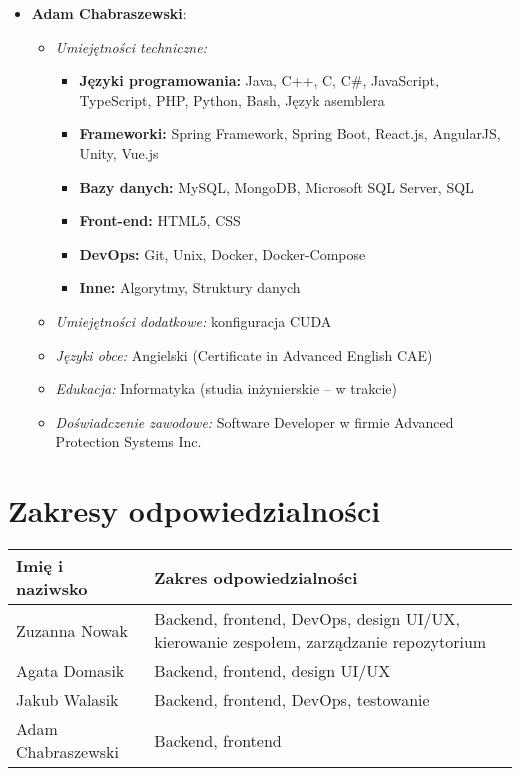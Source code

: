 \documentclass[12pt,a4paper,colorlinks=true,linkcolor=NavyBlue,citecolor=red,urlcolor=NavyBlue]{book}
\begin{document}
\begin{itemize}
    \item \textbf{Adam Chabraszewski}:
    \begin{itemize}
        \item \textit{Umiejętności techniczne:} 
        \begin{itemize}
            \item \textbf{Języki programowania:} Java, C++, C, C\#, JavaScript, TypeScript, PHP, Python, Bash, Język asemblera
            \item \textbf{Frameworki:} Spring Framework, Spring Boot, React.js, AngularJS, Unity, Vue.js
            \item \textbf{Bazy danych:} MySQL, MongoDB, Microsoft SQL Server, SQL
            \item \textbf{Front-end:} HTML5, CSS
            \item \textbf{DevOps:} Git, Unix, Docker, Docker-Compose
            \item \textbf{Inne:} Algorytmy, Struktury danych
        \end{itemize}
        \item \textit{Umiejętności dodatkowe:} konfiguracja CUDA
        \item \textit{Języki obce:} Angielski (Certificate in Advanced English CAE)
        \item \textit{Edukacja:} Informatyka (studia inżynierskie – w trakcie)
        \item \textit{Doświadczenie zawodowe:} Software Developer w firmie Advanced Protection Systems Inc.
    \end{itemize}
\end{itemize}

\section{Zakresy odpowiedzialności}
\begin{center}
\begin{tabular}{|p{4.5cm}|p{8cm}|}
\hline
\textbf{Imię i naziwsko} & \textbf{Zakres odpowiedzialności} \\
\hline
Zuzanna Nowak &  Backend, frontend, DevOps, design UI/UX, kierowanie zespołem, zarządzanie repozytorium\\
\hline
Agata Domasik &  Backend, frontend, design UI/UX\\
\hline
Jakub Walasik &  Backend, frontend, DevOps, testowanie\\
\hline
Adam Chabraszewski & Backend, frontend\\
\hline
\end{tabular}
\end{center}
\end{document}
